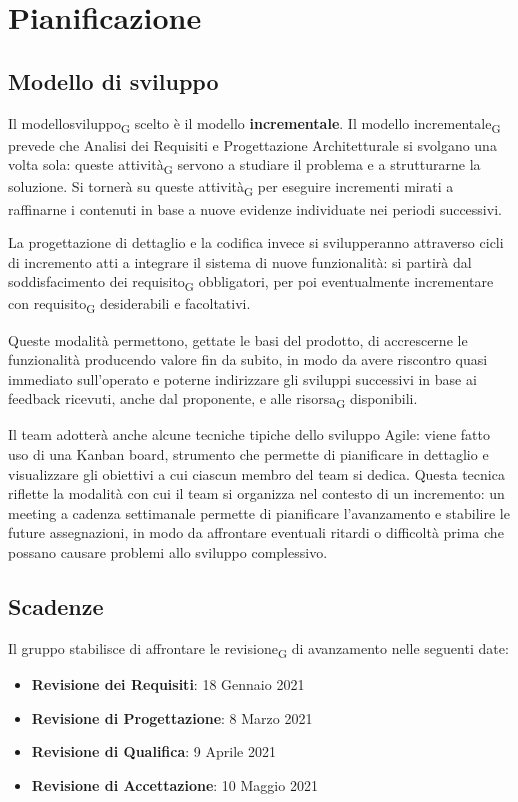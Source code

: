 \section{Pianificazione}

\subsection{Modello di sviluppo}

Il modellosviluppo\textsubscript{G} scelto è il modello \textbf{incrementale}. Il modello incrementale\textsubscript{G} prevede che Analisi dei Requisiti e Progettazione Architetturale si svolgano una volta sola: queste attività\textsubscript{G} servono a studiare il problema e a strutturarne la soluzione. Si tornerà su queste attività\textsubscript{G} per eseguire incrementi mirati a raffinarne i contenuti in base a nuove evidenze individuate nei periodi successivi.

La progettazione di dettaglio e la codifica invece si svilupperanno attraverso cicli di incremento atti a integrare il sistema di nuove funzionalità: si partirà dal soddisfacimento dei requisito\textsubscript{G} obbligatori, per poi eventualmente incrementare con requisito\textsubscript{G} desiderabili e facoltativi. 

Queste modalità permettono, gettate le basi del prodotto, di accrescerne le funzionalità producendo valore fin da subito, in modo da avere riscontro quasi immediato sull'operato e poterne indirizzare gli sviluppi successivi in base ai feedback ricevuti, anche dal proponente, e alle risorsa\textsubscript{G} disponibili.

Il team adotterà anche alcune tecniche tipiche dello sviluppo Agile: viene fatto uso di una Kanban board, strumento che permette di pianificare in dettaglio e visualizzare gli obiettivi a cui ciascun membro del team si dedica. Questa tecnica riflette la modalità con cui il team si organizza nel contesto di un incremento: un meeting a cadenza settimanale permette di pianificare l'avanzamento e stabilire le future assegnazioni, in modo da affrontare eventuali ritardi o difficoltà prima che possano causare problemi allo sviluppo complessivo.



\subsection{Scadenze}

Il gruppo stabilisce di affrontare le revisione\textsubscript{G} di avanzamento nelle seguenti date:
\begin{itemize}
	\item \textbf{Revisione dei Requisiti}: 18 Gennaio 2021
	\item \textbf{Revisione di Progettazione}: 8 Marzo 2021 
	\item \textbf{Revisione di Qualifica}: 9 Aprile 2021
	\item \textbf{Revisione di Accettazione}: 10 Maggio 2021	
\end{itemize}





